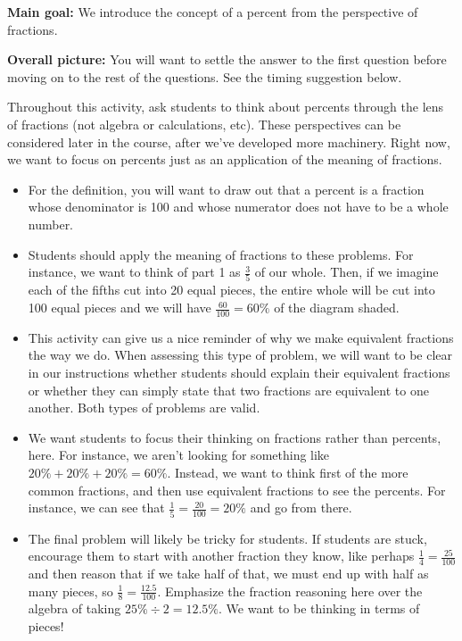 \documentclass[nooutcomes,noauthor,handout]{ximera}
\begin{document}
\begin{instructorNotes} 



{\bf Main goal:} We introduce the concept of a percent from the perspective of fractions.


{\bf Overall picture:} You will want to settle the answer to the first question before moving on to the rest of the questions. See the timing suggestion below. 

Throughout this activity, ask students to think about percents through the lens of fractions (not algebra or calculations, etc). These perspectives can be considered later in the course, after we've developed more machinery. Right now, we want to focus on percents just as an application of the meaning of fractions.

\begin{itemize}
	\item For the definition, you will want to draw out that a percent is a fraction whose denominator is 100 and whose numerator does not have to be a whole number. 
	\item Students should apply the meaning of fractions to these problems. For instance, we want to think of part 1 as $\frac35$ of our whole.  Then, if we imagine each of the fifths cut into 20 equal pieces, the entire whole will be cut into 100 equal pieces and we will have $\frac{60}{100} = 60\%$ of the diagram shaded.
	\item This activity can give us a nice reminder of why we make equivalent fractions the way we do. When assessing this type of problem, we will want to be clear in our instructions whether students should explain their equivalent fractions or whether they can simply state that two fractions are equivalent to one another. Both types of problems are valid.
	\item We want students to focus their thinking on fractions rather than percents, here. For instance, we aren't looking for something like $20\% + 20\% + 20\%  = 60\%$. Instead, we want to think first of the more common fractions, and then use equivalent fractions to see the percents. For instance, we can see that $\frac{1}{5} = \frac{20}{100} = 20\%$ and go from there.
	\item The final problem will likely be tricky for students. If students are stuck, encourage them to start with another fraction they know, like perhaps $\frac{1}{4} = \frac{25}{100}$ and then reason that if we take half of that, we must end up with half as many pieces, so $\frac{1}{8} = \frac{12.5}{100}$. Emphasize the fraction reasoning here over the algebra of taking $25\% \div 2 = 12.5\%$. We want to be thinking in terms of pieces!
\end{itemize}



\end{instructorNotes}
\end{document}
